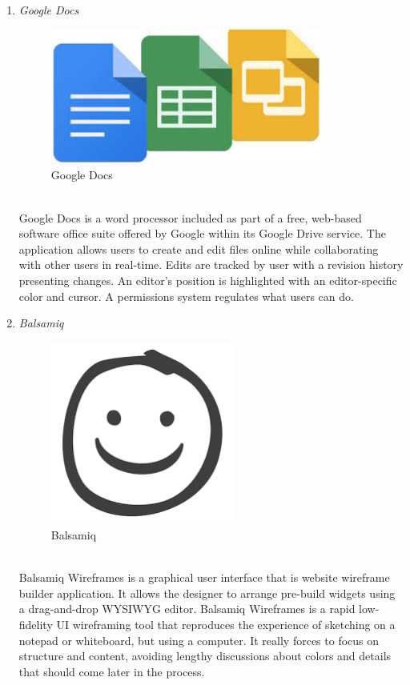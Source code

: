 \documentclass[conference]{IEEEtran}
\begin{document}
\begin{enumerate}
   \item \textit{Google Docs }
                   \begin{figure}[htbp]
	\centerline{\includegraphics[width=89mm, scale=0.5]{fig/google.jpg}}
	\caption{Google Docs}
	\label{fig}
	\end{figure}
   \\Google Docs is a word processor included as part of a free, web-based software office suite offered by Google within its Google Drive service. The application allows users to create and edit files online while collaborating with other users in real-time. Edits are tracked by user with a revision history presenting changes. An editor's position is highlighted with an editor-specific color and cursor. A permissions system regulates what users can do.\\
   \item \textit{Balsamiq }
                   \begin{figure}[htbp]
	\centerline{\includegraphics[width=60mm, scale=0.5]{fig/balsamiq.png}}
	\caption{Balsamiq }
	\label{fig}
	\end{figure}
   \\Balsamiq Wireframes is a graphical user interface that is website wireframe builder application. It allows the designer to arrange pre-build widgets using a drag-and-drop WYSIWYG editor. Balsamiq Wireframes is a rapid low-fidelity UI wireframing tool that reproduces the experience of sketching on a notepad or whiteboard, but using a computer. It really forces to focus on structure and content, avoiding lengthy discussions about colors and details that should come later in the process.\\

\end{enumerate}
\end{document}
